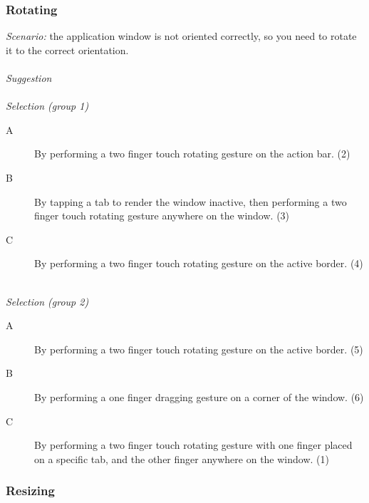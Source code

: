 \subsubsection{Rotating}
\emph{Scenario:}
the application window is not oriented correctly, so you need to rotate it to the correct orientation. 
\hfill\\
\hfill\\
\emph{Suggestion}
\hfill\\
\hfill\\
\emph{Selection (group 1)}
\begin{description}
\item[A]{By performing a two finger touch rotating gesture on the action bar. (2)}
\item[B]{By tapping a tab to render the window inactive, then performing a two finger touch rotating gesture anywhere on the window. (3)}
\item[C]{By performing a two finger touch rotating gesture on the active border. (4)}
\end{description}
\hfill\\
\emph{Selection (group 2)}
\begin{description}
\item[A]{By performing a two finger touch rotating gesture on the active border. (5)}
\item[B]{By performing a one finger dragging gesture on a corner of the window. (6)}
\item[C]{By performing a two finger touch rotating gesture with one finger placed on a specific tab, and the other finger anywhere on the window. (1)}
\end{description}


\subsubsection{Resizing}

